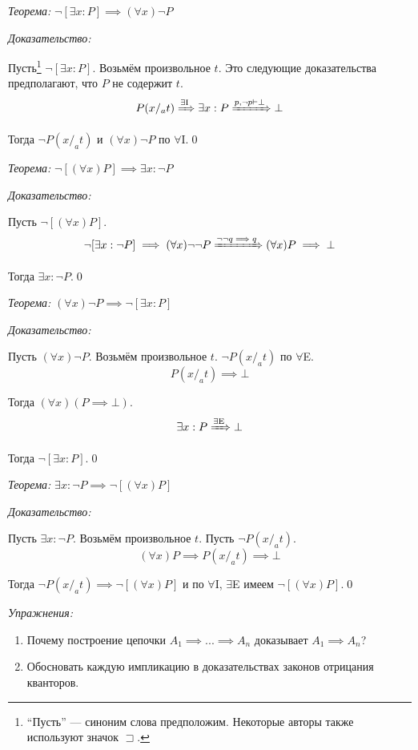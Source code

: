 {\it Теорема:} $\lnot[\exists x:P]\implies (\forall x)\lnot P$

{\it Доказательство:}

Пусть\footnote{
	``Пусть'' --- синоним слова предположим. Некоторые авторы также
	используют значок $\sqsupset$.
} $\lnot[\exists x:P]$. Возьмём произвольное $t$. Это следующие доказательства
предполагают, что $P$ не содержит $t$.
\[
	P(x/_{a}t)\xRightarrow{\text{$\exists$I}} \exists x:P
	\xRightarrow{p,\lnot p\vdash\bot} \bot
\]

Тогда $\lnot P(x/_{a}t)$ и $(\forall x)\lnot P$
по $\forall$I.\qed

{\it Теорема:} $\lnot[(\forall x)P]\implies \exists x:\lnot P$

{\it Доказательство:}

Пусть $\lnot[(\forall x)P]$.
\[
	\lnot[\exists x:\lnot P]\implies (\forall x)\lnot\lnot P
	\xRightarrow{\lnot\lnot q\implies q} (\forall x)P\implies\bot
\]

Тогда $\exists x:\lnot P$.\qed

\pagebreak

{\it Теорема:} $(\forall x)\lnot P\implies \lnot[\exists x:P]$

{\it Доказательство:}

Пусть $(\forall x)\lnot P$. Возьмём произвольное $t$. $\lnot P(x/_{a}t)$ по $\forall$E.
\[
	P(x/_{a}t)\implies \bot
\]

Тогда $(\forall x)(P\implies \bot)$.
\[
	\exists x:P\xRightarrow{\text{$\exists$E}} \bot
\]

Тогда $\lnot[\exists x:P]$.\qed

{\it Теорема:} $\exists x:\lnot P\implies\lnot[(\forall x)P]$

{\it Доказательство:}

Пусть $\exists x:\lnot P$. Возьмём произвольное $t$. Пусть $\lnot P(x/_{a}t)$.
\[
	(\forall x)P\implies P(x/_{a}t)\implies \bot
\]

Тогда ${\lnot P(x/_{a}t)\implies \lnot[(\forall x)P]}$ и по $\forall$I, $\exists$E
имеем $\lnot[(\forall x)P]$.\qed

{\it Упражнения:}
\begin{enumerate}
	\item{}Почему построение цепочки $A_1\implies...\implies A_{n}$
	доказывает $A_1\implies A_{n}$?
	\item{}Обосновать каждую импликацию в доказательствах законов отрицания кванторов.
\end{enumerate}

\pagebreak
